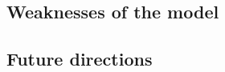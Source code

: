 \documentclass[pre,12pt]{revtex4-1}
\begin{document}
\subsection{Weaknesses of the model}

\subsection{Future directions}

\appendix

\section{}\label{AppendixA}




\end{document}
